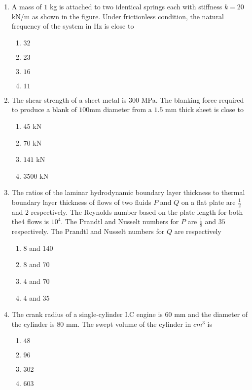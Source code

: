 \documentclass[journal,12pt,onecolumn]{IEEEtran}
\theoremstyle{remark}
\begin{document}
\begin{enumerate}[start=27]
\item A mass of $1$ kg is attached to two identical springs each with stiffness $k=20$ kN/m as shown in the figure. Under frictionless condition, the natural frequency of the system in Hz is close to

\hfill{}
\begin{enumerate}
\item $32$
\item $23$
\item $16$
\item $11$
\end{enumerate}

\item The shear strength of a sheet metal is $300$ MPa. The blanking force required to produce a blank of $100$mm diameter from a $1.5$ mm thick sheet is close to
\hfill{}
\begin{enumerate}
\item $45$ kN
\item $70$ kN
\item $141$ kN
\item $3500$ kN
\end{enumerate}

\item The ratios of the laminar hydrodynamic boundary layer thickness to thermal boundary layer thickness of flows of two fluids $P$ and $Q$ on a flat plate are $\frac{1}{2}$ and $2$ respectively. The Reynolds number based on the plate length for both the4 flows is $10^4$. The Prandtl and Nusselt numbers for $P$ are $\frac{1}{8}$ and $35$ respectively. The Prandtl and Nusselt numbers for $Q$ are respectively
\hfill{}
\begin{enumerate}
\item $8$ and $140$
\item $8$ and $70$
\item $4$ and $70$
\item $4$ and $35$
\end{enumerate}

\item The crank radius of a single-cylinder I.C engine is $60$ mm and the diameter of the cylinder is $80$ mm. The swept volume of the cylinder in ${cm}^3$ is
\hfill{}
\begin{enumerate}
\item $48$
\item $96$
\item $302$
\item $603$
\end{enumerate}


\end{enumerate}
\end{document}
